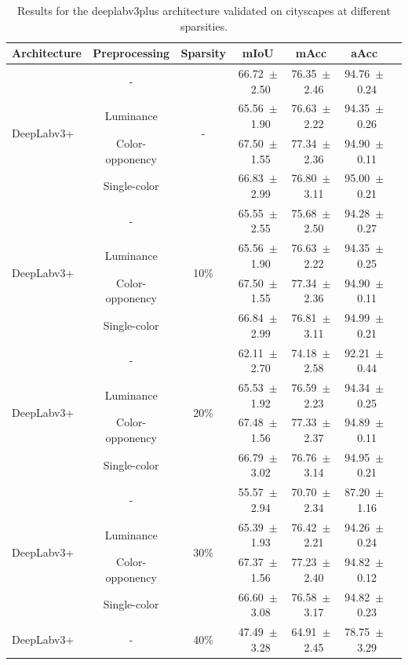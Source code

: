 \begin{table}[h]
\centering
\caption{Results for the deeplabv3plus architecture validated on cityscapes at different sparsities.}
\begin{tabular}{@{}lccc ccc@{}}
\toprule
Architecture & Preprocessing & Sparsity & mIoU & mAcc & aAcc \\
\midrule

\multirow{4}{*}{DeepLabv3+} & - & \multirow{4}{*}{-} & 66.72~$\pm$~2.50 & 76.35~$\pm$~2.46 & 94.76~$\pm$~0.24 \\
& Luminance & & 65.56~$\pm$~1.90 & 76.63~$\pm$~2.22 & 94.35~$\pm$~0.26 \\
& Color-opponency & & 67.50~$\pm$~1.55 & 77.34~$\pm$~2.36 & 94.90~$\pm$~0.11 \\
& Single-color & & 66.83~$\pm$~2.99 & 76.80~$\pm$~3.11 & 95.00~$\pm$~0.21 \\
\midrule
\multirow{4}{*}{DeepLabv3+} & - & \multirow{4}{*}{10\%} & 65.55~$\pm$~2.55 & 75.68~$\pm$~2.50 & 94.28~$\pm$~0.27 \\
& Luminance & & 65.56~$\pm$~1.90 & 76.63~$\pm$~2.22 & 94.35~$\pm$~0.25 \\
& Color-opponency & & 67.50~$\pm$~1.55 & 77.34~$\pm$~2.36 & 94.90~$\pm$~0.11 \\
& Single-color & & 66.84~$\pm$~2.99 & 76.81~$\pm$~3.11 & 94.99~$\pm$~0.21 \\
\midrule
\multirow{4}{*}{DeepLabv3+} & - & \multirow{4}{*}{20\%} & 62.11~$\pm$~2.70 & 74.18~$\pm$~2.58 & 92.21~$\pm$~0.44 \\
& Luminance & & 65.53~$\pm$~1.92 & 76.59~$\pm$~2.23 & 94.34~$\pm$~0.25 \\
& Color-opponency & & 67.48~$\pm$~1.56 & 77.33~$\pm$~2.37 & 94.89~$\pm$~0.11 \\
& Single-color & & 66.79~$\pm$~3.02 & 76.76~$\pm$~3.14 & 94.95~$\pm$~0.21 \\
\midrule
\multirow{4}{*}{DeepLabv3+} & - & \multirow{4}{*}{30\%} & 55.57~$\pm$~2.94 & 70.70~$\pm$~2.34 & 87.20~$\pm$~1.16 \\
& Luminance & & 65.39~$\pm$~1.93 & 76.42~$\pm$~2.21 & 94.26~$\pm$~0.24 \\
& Color-opponency & & 67.37~$\pm$~1.56 & 77.23~$\pm$~2.40 & 94.82~$\pm$~0.12 \\
& Single-color & & 66.60~$\pm$~3.08 & 76.58~$\pm$~3.17 & 94.82~$\pm$~0.23 \\
\midrule
\multirow{4}{*}{DeepLabv3+} & - & \multirow{4}{*}{40\%} & 47.49~$\pm$~3.28 & 64.91~$\pm$~2.45 & 78.75~$\pm$~3.29 \\

\end{tabular}
\end{table}
